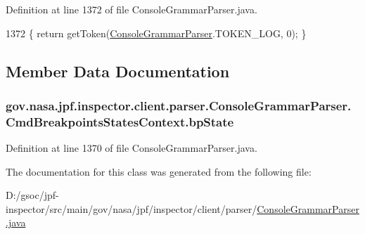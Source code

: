 Definition at line 1372 of file Console\+Grammar\+Parser.\+java.


\begin{DoxyCode}
1372 \{ \textcolor{keywordflow}{return} getToken(\hyperlink{classgov_1_1nasa_1_1jpf_1_1inspector_1_1client_1_1parser_1_1_console_grammar_parser_a03e28f396e991cff9d014f357ae220f3}{ConsoleGrammarParser}.TOKEN\_LOG, 0); \}
\end{DoxyCode}


\subsection{Member Data Documentation}
\subsubsection[{\texorpdfstring{bp\+State}{bpState}}]{ gov.\+nasa.\+jpf.\+inspector.\+client.\+parser.\+Console\+Grammar\+Parser.\+Cmd\+Breakpoints\+States\+Context.\+bp\+State}\hypertarget{classgov_1_1nasa_1_1jpf_1_1inspector_1_1client_1_1parser_1_1_console_grammar_parser_1_1_cmd_breakpoints_states_context_a9c52de9d989cd933567a1c799d241e4b}{}\label{classgov_1_1nasa_1_1jpf_1_1inspector_1_1client_1_1parser_1_1_console_grammar_parser_1_1_cmd_breakpoints_states_context_a9c52de9d989cd933567a1c799d241e4b}


Definition at line 1370 of file Console\+Grammar\+Parser.\+java.



The documentation for this class was generated from the following file\+:\begin{DoxyCompactItemize}
\item 
D\+:/gsoc/jpf-\/inspector/src/main/gov/nasa/jpf/inspector/client/parser/\hyperlink{_console_grammar_parser_8java}{Console\+Grammar\+Parser.\+java}\end{DoxyCompactItemize}
